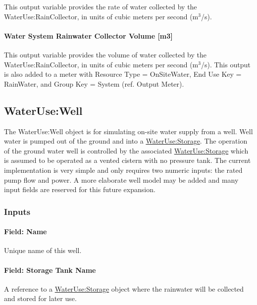 This output variable provides the rate of water collected by the WaterUse:RainCollector, in units of cubic meters per second (m\(^{3}\)/s).

\paragraph{Water System Rainwater Collector Volume {[}m3{]}}\label{water-system-rainwater-collector-volume-m3}

This output variable provides the volume of water collected by the WaterUse:RainCollector, in units of cubic meters per second (m\(^{3}\)/s). This output is also added to a meter with Resource Type = OnSiteWater, End Use Key = RainWater, and Group Key = System (ref. Output Meter).

\subsection{WaterUse:Well}\label{waterusewell}

The WaterUse:Well object is for simulating on-site water supply from a well. Well water is pumped out of the ground and into a \hyperref[waterusestorage]{WaterUse:Storage}. The operation of the ground water well is controlled by the associated \hyperref[waterusestorage]{WaterUse:Storage} which is assumed to be operated as a vented cistern with no pressure tank. The current implementation is very simple and only requires two numeric inputs: the rated pump flow and power. A more elaborate well model may be added and many input fields are reserved for this future expansion.

\subsubsection{Inputs}\label{inputs-4-038}

\paragraph{Field: Name}\label{field-name-4-033}

Unique name of this well.

\paragraph{Field: Storage Tank Name}\label{field-storage-tank-name-1}

A reference to a \hyperref[waterusestorage]{WaterUse:Storage} object where the rainwater will be collected and stored for later use.

